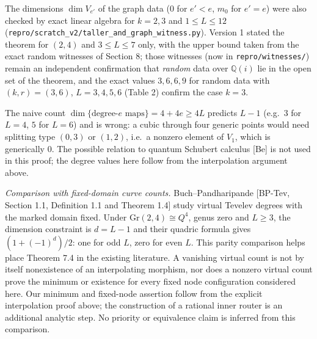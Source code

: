 \documentclass[
  11pt,
  a4paper,
]{article}
\newcounter{none} %
\begin{document}
The dimensions \(\dim V_{e'}\) of the graph data (\(0\) for \(e'<e\),
\(m_0\) for \(e'=e\)) were also checked by exact linear algebra for
\(k=2,\allowbreak{}3\) and \(1\le L\le12\)
({\small\texttt{repro/\allowbreak{}scratch\_\allowbreak{}v2/\allowbreak{}taller\_\allowbreak{}and\_\allowbreak{}graph\_\allowbreak{}witness.\allowbreak{}py}}). Version 1
stated the theorem for \((2,\allowbreak{}4)\) and \(3\le L\le7\) only, with the upper
bound taken from the exact random witnesses of Section 8; those
witnesses (now in {\small\texttt{repro/\allowbreak{}witnesses/\allowbreak{}}}) remain an independent
confirmation that \emph{random} data over \(\mathbb Q(i)\) lie in the
open set of the theorem, and the exact values \(3,\allowbreak{}6,\allowbreak{}6,\allowbreak{}9\) for random
data with \((k,\allowbreak{}r)=(3,\allowbreak{}6)\), \(L=3,\allowbreak{}4,\allowbreak{}5,\allowbreak{}6\) (Table 2) confirm the case
\(k=3\).

The naive count \(\dim\{\text{degree-}e\text{ maps}\}=4+4e\ge4L\)
predicts \(L-1\) (e.g.~\(3\) for \(L=4\), \(5\) for \(L=6\)) and is
wrong: a cubic through four generic points would need splitting type
\((0,\allowbreak{}3)\) or \((1,\allowbreak{}2)\), i.e.~a nonzero element of \(V_1\), which is
generically \(0\). The possible relation to quantum Schubert calculus
{[}Be{]} is not used in this proof; the degree values here follow from
the interpolation argument above.

\emph{Comparison with fixed-domain curve counts.} Buch--Pandharipande
{[}BP-Tev, Section 1.1, Definition 1.1 and Theorem 1.4{]} study virtual
Tevelev degrees with the marked domain fixed. Under
\(\mathrm{Gr}(2,\allowbreak{}4)\cong Q^4\), genus zero and \(L\ge3\), the dimension
constraint is \(d=L-1\) and their quadric formula gives
\((1+(-1)^d)/2\): one for odd \(L\), zero for even \(L\). This parity
comparison helps place Theorem 7.4 in the existing literature. A
vanishing virtual count is not by itself nonexistence of an
interpolating morphism, nor does a nonzero virtual count prove the
minimum or existence for every fixed node configuration considered here.
Our minimum and fixed-node assertion follow from the explicit
interpolation proof above; the construction of a rational inner router
is an additional analytic step. No priority or equivalence claim is
inferred from this comparison.
\end{document}
